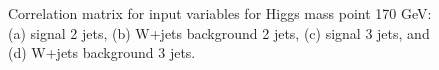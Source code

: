 \begin{figure}[bthp!]
{}
\caption{\label{fig:FigCorr170Mu} 
Correlation matrix for input variables for Higgs mass point 170 GeV:
(a) signal 2 jets, (b) W+jets background 2 jets, 
(c) signal 3 jets, and (d) W+jets background 3 jets.
}
\end{figure}
\newpage
